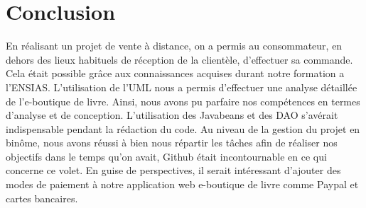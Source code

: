 
\chapter{Conclusion }


En réalisant un projet de vente à distance, on a permis au consommateur, en dehors des lieux habituels de réception de la clientèle, d'effectuer sa commande. Cela était possible grâce aux connaissances acquises durant notre formation a l'ENSIAS.
\newline
L’utilisation de l'UML nous a permis d’effectuer une analyse détaillée de l'e-boutique de livre. Ainsi, nous avons pu parfaire nos compétences en termes d’analyse et de conception.
L'utilisation des Javabeans et des DAO s'avérait indispensable pendant la rédaction du code.
\newline
Au niveau de la gestion du projet en binôme, nous avons réussi à bien nous répartir les tâches afin de réaliser nos objectifs dans le temps qu'on avait, Github était incontournable en ce qui concerne ce volet.
En guise de perspectives, il serait intéressant d’ajouter des modes de paiement à notre application web e-boutique de livre comme Paypal et cartes bancaires.